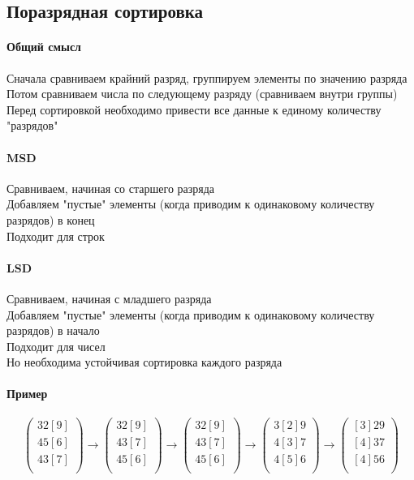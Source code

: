 \documentclass[a4paper,10pt]{article}
\begin{document}
	\subsection{Поразрядная сортировка}
	\paragraph{Общий смысл}
	Сначала сравниваем крайний разряд, группируем элементы по значению разряда \\
	Потом сравниваем числа по следующему разряду (сравниваем внутри группы) \\
	Перед сортировкой необходимо привести все данные к единому количеству "разрядов"
	\paragraph{MSD}
	Сравниваем, начиная со старшего разряда \\
	Добавляем "пустые" элементы (когда приводим к одинаковому количеству разрядов) в конец \\
	Подходит для строк \\
	\paragraph{LSD}
	Сравниваем, начиная с младшего разряда \\
	Добавляем "пустые" элементы (когда приводим к одинаковому количеству разрядов) в начало \\
	Подходит для чисел \\
	Но необходима устойчивая сортировка каждого разряда \\
	\paragraph{Пример}
	\[
		\begin{pmatrix}
			32[9] \\
			45[6] \\
			43[7] \\
		\end{pmatrix}
		\rightarrow
		\begin{pmatrix}
			32[9] \\
			43[7] \\
			45[6] \\
		\end{pmatrix}
		\rightarrow
		\begin{pmatrix}
			32[9] \\
			43[7] \\
			45[6] \\
		\end{pmatrix}
		\rightarrow
		\begin{pmatrix}
			3[2]9 \\
			4[3]7 \\
			4[5]6 \\
		\end{pmatrix}
		\rightarrow
		\begin{pmatrix}
			[3]29 \\
			[4]37 \\
			[4]56 \\
		\end{pmatrix}
	\]	
\end{document}
